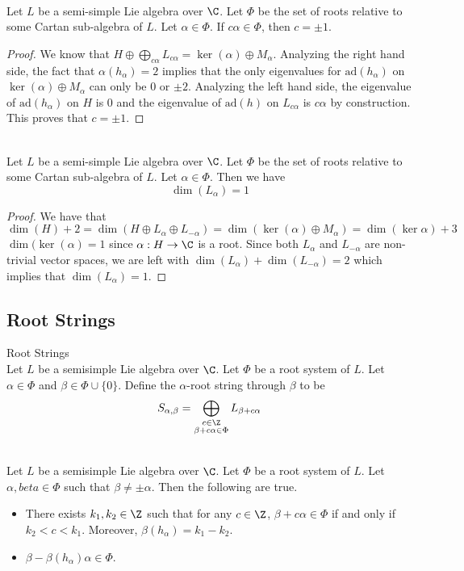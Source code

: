 \documentclass[a4paper]{article}
\begin{document}
\begin{prp}{}{} \\Let $L$ be a semi-simple Lie algebra over $\C$. Let $\Phi$ be the set of roots relative to some Cartan sub-algebra of $L$. Let $\alpha\in\Phi$. If $c\alpha\in\Phi$, then $c=\pm1$. 
\begin{proof}
We know that $H\oplus\bigoplus_{c\alpha} L_{c\alpha}=\ker(\alpha)\oplus M_\alpha$. Analyzing the right hand side, the fact that $\alpha(h_\alpha)=2$ implies that the only eigenvalues for $\text{ad}(h_\alpha)$ on $\ker(\alpha)\oplus M_\alpha$ can only be $0$ or $\pm2$. Analyzing the left hand side, the eigenvalue of $\text{ad}(h_\alpha)$ on $H$ is $0$ and the eigenvalue of $\text{ad}(h)$ on $L_{c\alpha}$ is $c\alpha$ by construction. This proves that $c=\pm1$. 
\end{proof}
\end{prp}

\begin{prp}{}{} \\Let $L$ be a semi-simple Lie algebra over $\C$. Let $\Phi$ be the set of roots relative to some Cartan sub-algebra of $L$. Let $\alpha\in\Phi$. Then we have $$\dim(L_\alpha)=1$$ 
\begin{proof}
We have that $$\dim(H)+2=\dim\left(H\oplus L_\alpha\oplus L_{-\alpha}\right)=\dim(\ker(\alpha)\oplus M_\alpha)=\dim(\ker\alpha)+3$$ $\dim(\ker(\alpha)=1$ since $\alpha:H\to\C$ is a root. Since both $L_\alpha$ and $L_{-\alpha}$ are non-trivial vector spaces, we are left with $\dim(L_\alpha)+\dim(L_{-\alpha})=2$ which implies that $\dim(L_\alpha)=1$. 
\end{proof}
\end{prp}

\subsection{Root Strings}
\begin{defn}{Root Strings}{} \\Let $L$ be a semisimple Lie algebra over $\C$. Let $\Phi$ be a root system of $L$. Let $\alpha\in\Phi$ and $\beta\in\Phi\cup\{0\}$. Define the $\alpha$-root string through $\beta$ to be $$S_{\alpha,\beta}=\bigoplus_{\substack{c\in\Z\\\beta+c\alpha\in\Phi}}L_{\beta+c\alpha}$$
\end{defn}

\begin{lmm}{}{} \\Let $L$ be a semisimple Lie algebra over $\C$. Let $\Phi$ be a root system of $L$. Let $\alpha,beta\in\Phi$ such that $\beta\neq\pm\alpha$. Then the following are true. 
\begin{itemize}
\item There exists $k_1,k_2\in\Z$ such that for any $c\in\Z$, $\beta+c\alpha\in\Phi$ if and only if $k_2<c<k_1$. Moreover, $\beta(h_\alpha)=k_1-k_2$. 
\item $\beta-\beta(h_\alpha)\alpha\in\Phi$. 
\end{itemize}
\end{lmm}
\end{document}
